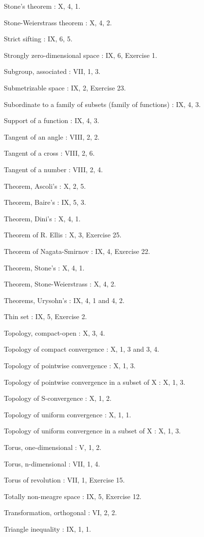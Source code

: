 Stone's theorem : X, 4, 1.

Stone-Weierstrass theorem : X, 4, 2.

Strict sifting : IX, 6, 5.

Strongly zero-dimensional space : IX, 6, Exercise 1.

Subgroup, associated : VII, 1, 3.

Submetrizable space : IX, 2, Exercise 23.

Subordinate to a family of subsets (family of functions) : IX, 4, 3.

Support of a function : IX, 4, 3.

Tangent of an angle : VIII, 2, 2.

Tangent of a cross : VIII, 2, 6.

Tangent of a number : VIII, 2, 4.

Theorem, Ascoli's : X, 2, 5.

Theorem, Baire's : IX, 5, 3.

Theorem, Dini's : X, 4, 1.

Theorem of R. Ellis : X, 3, Exercise 25.

Theorem of Nagata-Smirnov : IX, 4, Exercise 22.

Theorem, Stone's : X, 4, 1.

Theorem, Stone-Weierstrass : X, 4, 2.

Theorems, Urysohn's : IX, 4, 1 and 4, 2.

Thin set : IX, 5, Exercise 2.

Topology, compact-open : X, 3, 4.

Topology of compact convergence : X, 1, 3 and 3, 4.

Topology of pointwise convergence : X, 1, 3.

Topology of pointwise convergence in a subset of X : X, 1, 3.

Topology of S-convergence : X, 1, 2.

Topology of uniform convergence : X, 1, 1.

Topology of uniform convergence in a subset of X : X, 1, 3.

Torus, one-dimensional : V, 1, 2.

Torus, n-dimensional : VII, 1, 4.

Torus of revolution : VII, 1, Exercise 15.

Totally non-meagre space : IX, 5, Exercise 12.

Transformation, orthogonal : VI, 2, 2.

Triangle inequality : IX, 1, 1.

